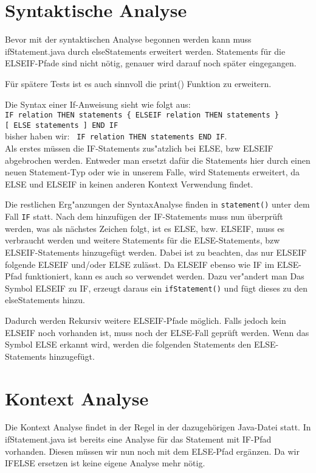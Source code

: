 \section{Syntaktische Analyse}
Bevor mit der syntaktischen Analyse begonnen werden kann muss  ifStatement.java
durch elseStatements erweitert werden. Statements für die ELSEIF-Pfade sind nicht nötig, genauer wird darauf noch später eingegangen.

Für spätere Tests ist es auch sinnvoll die print() Funktion zu erweitern.

\vspace{3mm}
Die Syntax einer If-Anweisung sieht wie folgt aus:\\ \verb|IF relation THEN statements { ELSEIF relation THEN statements }|\\
\verb|[ ELSE statements ] END IF|\\  bisher haben wir: \verb| IF relation THEN statements END IF|.\\
Als erstes müssen die IF-Statements zus"atzlich bei ELSE, bzw ELSEIF abgebrochen werden.
Entweder man ersetzt dafür die Statements hier durch einen neuen Statement-Typ oder wie in unserem Falle, wird Statements erweitert, da ELSE und ELSEIF in keinen anderen Kontext Verwendung findet.

Die restlichen Erg"anzungen der SyntaxAnalyse finden in \verb|statement()| unter dem Fall \verb|IF| statt.
Nach dem hinzufügen der IF-Statements muss nun überprüft werden, was als nächstes Zeichen folgt, ist es ELSE, bzw. ELSEIF, muss es verbraucht werden und weitere Statements für die ELSE-Statements, bzw ELSEIF-Statements hinzugefügt werden.
Dabei ist zu beachten, das nur ELSEIF folgende ELSEIF und/oder ELSE zulässt.
Da ELSEIF ebenso wie IF im ELSE-Pfad funktioniert, kann es auch so verwendet werden.
Dazu ver"andert man Das Symbol ELSEIF zu IF, erzeugt daraus ein \verb|ifStatement()| und fügt dieses zu den elseStatements hinzu.

Dadurch werden Rekursiv weitere ELSEIF-Pfade möglich.
Falls jedoch kein ELSEIF noch vorhanden ist, muss noch der ELSE-Fall geprüft werden.
Wenn das Symbol ELSE erkannt wird, werden die folgenden Statements den ELSE-Statements hinzugefügt.


\section{Kontext Analyse}
Die Kontext Analyse findet in der Regel in der dazugehörigen Java-Datei statt.
In ifStatement.java ist bereits eine Analyse für das Statement mit IF-Pfad vorhanden. Diesen müssen wir nun noch mit dem ELSE-Pfad ergänzen. Da wir IFELSE ersetzen ist keine eigene Analyse mehr nötig.


